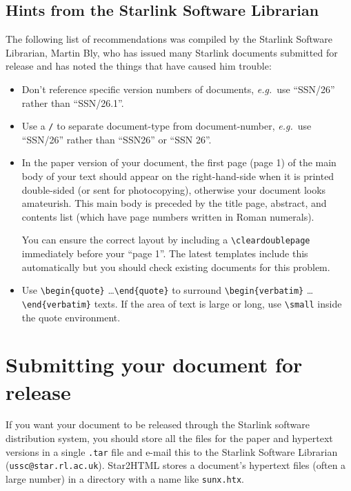 \documentclass[twoside,11pt]{article}
\newcommand{\xlabel}[1]{}
\renewcommand{\_}{\texttt{\symbol{95}}}
\begin{document}
\subsection{\xlabel{hints_from_the_starlink_software_librarian}Hints from the Starlink Software Librarian}

The following list of recommendations was compiled by the Starlink Software
Librarian, Martin Bly, who has issued many Starlink documents submitted for
release and has noted the things that have caused him trouble:

\begin{itemize}

\item Don't reference specific version numbers of documents, \textit{e.g.}\ use
``SSN/26'' rather than ``SSN/26.1''.

\item Use a \verb+/+ to separate document-type from
document-number, \textit{e.g.}\ use ``SSN/26'' rather than ``SSN26'' or
``SSN 26''.

\item In the paper version of your document, the first page (page 1)
of the main body of your text should appear on the right-hand-side
when it is printed double-sided (or sent for photocopying), otherwise
your document looks amateurish.  This main body is preceded by the
title page, abstract, and contents list (which have page numbers
written in Roman numerals).

You can ensure the correct layout by including a \verb+\cleardoublepage+
immediately before your ``page 1''.
The latest templates include this automatically but you should check existing
documents for this problem.

\item Use \verb+\begin{quote}+ \ldots \verb+\end{quote}+ to surround
\verb+\+\verb+begin{verbatim}+ \ldots \verb+\+\verb+end{verbatim}+ texts.
If the area of text is large or long, use \verb+\small+ inside the quote
environment.

\end{itemize}

\section{\xlabel{submitting_your_document_for_release}Submitting your document for release}

If you want your document to be released through the Starlink software
distribution system, you should store all the files for the paper and
hypertext versions in a single \texttt{.tar} file and e-mail this to the
Starlink Software Librarian (\texttt{ussc@star.rl.ac.uk}).
Star2HTML stores a document's hypertext files (often a large number) in a
directory with a name like \texttt{sunx.htx}.
\end{document}
